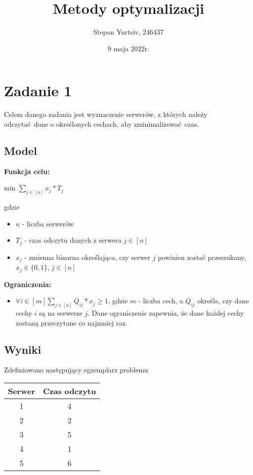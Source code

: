 \documentclass[12pt, a4paper]{article}
\title{Metody optymalizacji}
\author{Stepan Yurtsiv, 246437}
\date{9 maja 2022r.}
\begin{document}
\maketitle

\section{Zadanie 1}

Celem danego zadania jest wyznaczenie serwerów, z których należy odczytać dane o określonych cechach,
aby zminimalizować czas.

\subsection{Model}

\textbf{Funkcja celu:}

\begin{center}
	min \textbf{$\displaystyle\sum_{j \in [n]} x_j * T_j$}
\end{center}
gdzie

\begin{itemize}
    \item $n$ - liczba serwerów
    \item $T_j$ - czas odczytu danych z serwera $j \in [n]$
    \item $x_j$ - zmienna binarna określająca, czy serwer $j$ powinien zostać przeszukany, $x_j \in \{0, 1\}$, $j \in [n]$
\end{itemize}
\textbf{Ograniczenia:}

\begin{itemize}
    \item {$\forall{i \in [m]}\displaystyle\sum_{j \in [n]} Q_{ij} * x_j \geq 1$}, gdzie $m$ - liczba cech, a $Q_{ij}$ określa, czy dane cechy $i$ są na serwerze $j$. Dane ograniczenie zapewnia, że dane każdej cechy zostaną przeczytane co najmniej raz.
\end{itemize}

\subsection{Wyniki}

Zdefiniowano następujący egzemplarz problemu

\begin{center}
\begin{tabular}{|c|c|}
  \hline
  Serwer & Czas odczytu \\
  \hline
  1 & 4 \\
  \hline
  2 & 2 \\
  \hline
  3 & 5 \\
  \hline
  4 & 1 \\
  \hline
  5 & 6 \\
  \hline
\end{tabular}
\end{center}
\end{document}
